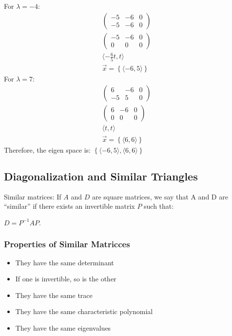 \documentclass[
  letterpaper,
  DIV=11,
  numbers=noendperiod]{scrartcl}
\providecommand{\tightlist}{%
  \setlength{\itemsep}{0pt}\setlength{\parskip}{0pt}}\usepackage{longtable,booktabs,array}
\begin{document}
For \(\lambda=-4\): \begin{align*}
\left(\begin{array}{cc|c}-5 & -6 & 0 \\ -5 & -6 & 0\end{array}\right) \\
\left(\begin{array}{cc|c}-5 & -6 & 0 \\ 0 & 0 & 0\end{array}\right) \\
\langle-\frac{6}{5}t, t\rangle \\
\vec{x} = \left\{\langle-6, 5\rangle\right\}
\end{align*} For \(\lambda=7\): \begin{align*}
\left(\begin{array}{cc|c}6 & -6 & 0 \\ -5 & 5 & 0\end{array}\right) \\
\left(\begin{array}{cc|c}6 & -6 & 0 \\ 0 & 0 & 0\end{array}\right) \\
\langle t, t\rangle \\
\vec{x} = \left\{\langle6, 6\rangle\right\}
\end{align*} Therefore, the eigen space is:
\(\left\{\langle-6, 5\rangle, \langle6, 6\rangle\right\}\)

\hypertarget{diagonalization-and-similar-triangles}{%
\subsection{Diagonalization and Similar
Triangles}\label{diagonalization-and-similar-triangles}}

Similar matrices: If \(A\) and \(D\) are square matrices, we say that A
and D are ``similar'' if there exists an invertible matrix \(P\) such
that:

\(D = P^{-1}AP\).

\hypertarget{properties-of-similar-matricces}{%
\subsubsection{Properties of Similar
Matricces}\label{properties-of-similar-matricces}}

\begin{itemize}
\tightlist
\item
  They have the same determinant
\item
  If one is invertible, so is the other
\item
  They have the same trace
\item
  They have the same characteristic polynomial
\item
  They have the same eigenvalues
\end{itemize}
\end{document}
